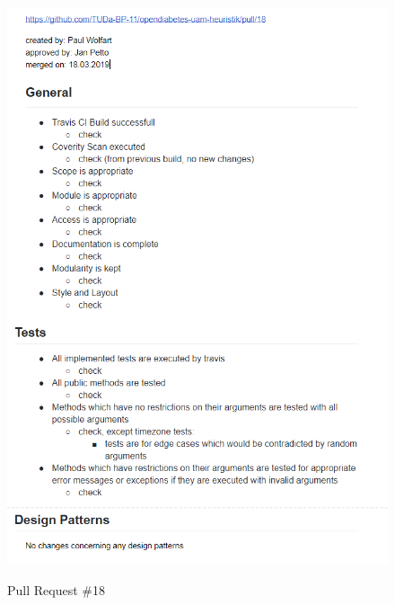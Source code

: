 \documentclass[accentcolor=tud0b,12pt,paper=a4]{tudreport}
\begin{document}
\begin{figure}[h]
\centering
\caption{Pull Request \#18}
\includegraphics[width=\textwidth,height=\textheight,keepaspectratio]{pr-18}
\label{pr:18}
\end{figure}
\end{document}
